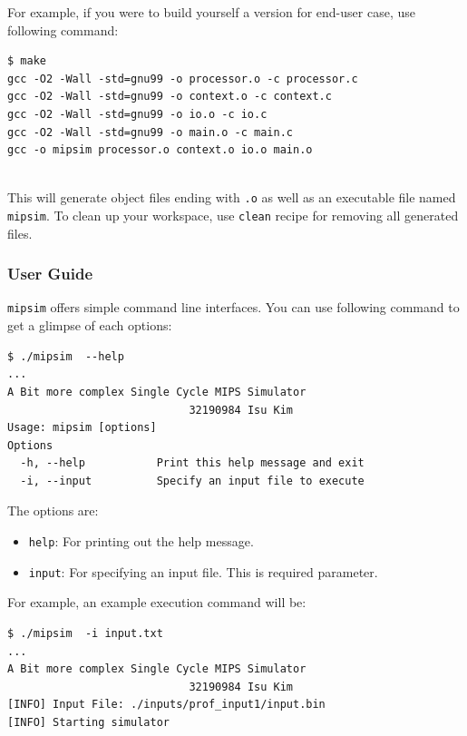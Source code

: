 \documentclass{homework}
\begin{document}
For example, if you were to build yourself a version for end-user case, use following command:
\\
\begin{center}
\begin{code}
\begin{verbatim}
$ make
gcc -O2 -Wall -std=gnu99 -o processor.o -c processor.c
gcc -O2 -Wall -std=gnu99 -o context.o -c context.c
gcc -O2 -Wall -std=gnu99 -o io.o -c io.c
gcc -O2 -Wall -std=gnu99 -o main.o -c main.c
gcc -o mipsim processor.o context.o io.o main.o
\end{verbatim}
\end{code}
\end{center}
\\
This will generate object files ending with \texttt{.o} as well as an executable file named \texttt{mipsim}. To clean up your workspace, use \texttt{clean} recipe for removing all generated files.

\subsubsection{User Guide}
\texttt{mipsim} offers simple command line interfaces. You can use following command to get a glimpse of each options:
\\
\begin{center}
\begin{code}
\begin{verbatim}
$ ./mipsim  --help
...
A Bit more complex Single Cycle MIPS Simulator
                            32190984 Isu Kim
Usage: mipsim [options]
Options
  -h, --help           Print this help message and exit
  -i, --input          Specify an input file to execute
\end{verbatim}
\end{code}
\end{center}

The options are:
\begin{itemize}
    \item \texttt{help}: For printing out the help message.
    \item \texttt{input}: For specifying an input file. This is required parameter.
\end{itemize}

For example, an example execution command will be:
\\
\begin{center}
\begin{code}
\begin{verbatim}
$ ./mipsim  -i input.txt
...
A Bit more complex Single Cycle MIPS Simulator
                            32190984 Isu Kim
[INFO] Input File: ./inputs/prof_input1/input.bin
[INFO] Starting simulator
\end{verbatim}
\end{code}
\end{center}
\end{document}
